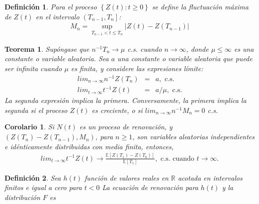 \documentclass{article}
\newtheorem{Def}{Definición}[section]
\newtheorem{Teo}{Teorema}[section]
\newtheorem{Coro}{Corolario}[section]
\newcommand{\rea}{\mathbb{R}}
\newcommand{\esp}{\mathbb{E}}
\numberwithin{equation}{section}
\begin{document}
{\begin{Def}
Para el proceso $\left\{Z\left(t\right):t\geq0\right\}$ se define la fluctuaci\'on m\'axima de $Z\left(t\right)$ en el intervalo $\left(T_{n-1},T_{n}\right]$:
\begin{eqnarray*}
M_{n}=\sup_{T_{n-1}<t\leq T_{n}}|Z\left(t\right)-Z\left(T_{n-1}\right)|
\end{eqnarray*}
\end{Def}

\begin{Teo}
Sup\'ongase que $n^{-1}T_{n}\rightarrow\mu$ c.s. cuando $n\rightarrow\infty$, donde $\mu\leq\infty$ es una constante o variable aleatoria. Sea $a$ una constante o variable aleatoria que puede ser infinita cuando $\mu$ es finita, y considere las expresiones l\'imite:
\begin{eqnarray}
lim_{n\rightarrow\infty}n^{-1}Z\left(T_{n}\right)&=&a,\textrm{ c.s.}\\
lim_{t\rightarrow\infty}t^{-1}Z\left(t\right)&=&a/\mu,\textrm{ c.s.}
\end{eqnarray}
La segunda expresi\'on implica la primera. Conversamente, la primera implica la segunda si el proceso $Z\left(t\right)$ es creciente, o si $lim_{n\rightarrow\infty}n^{-1}M_{n}=0$ c.s.
\end{Teo}

\begin{Coro}
Si $N\left(t\right)$ es un proceso de renovaci\'on, y $\left(Z\left(T_{n}\right)-Z\left(T_{n-1}\right),M_{n}\right)$, para $n\geq1$, son variables aleatorias independientes e id\'enticamente distribuidas con media finita, entonces,
\begin{eqnarray}
lim_{t\rightarrow\infty}t^{-1}Z\left(t\right)\rightarrow\frac{\esp\left[Z\left(T_{1}\right)-Z\left(T_{0}\right)\right]}{\esp\left[T_{1}\right]},\textrm{ c.s. cuando  }t\rightarrow\infty.
\end{eqnarray}
\end{Coro}


%
%


\begin{Def}
Sea $h\left(t\right)$ funci\'on de valores reales en $\rea$ acotada en intervalos finitos e igual a cero para $t<0$ La ecuaci\'on de renovaci\'on para $h\left(t\right)$ y la distribuci\'on $F$ es


\end{Def}}
\end{document}
